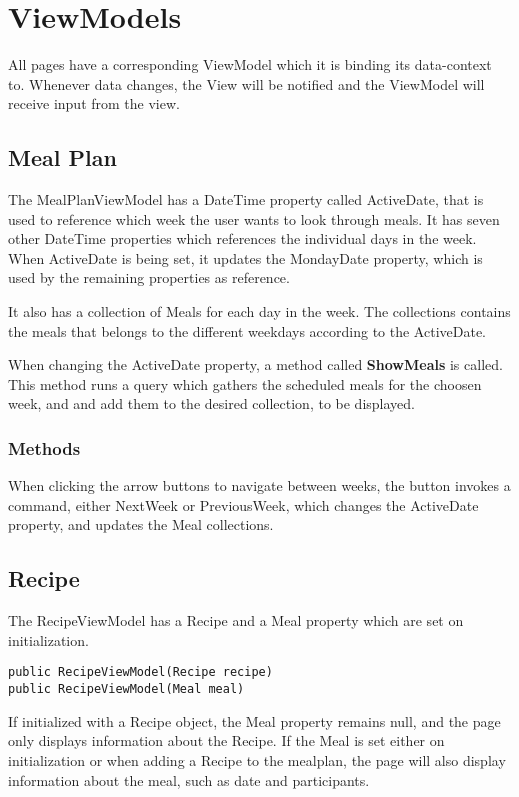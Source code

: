 \chapter{ViewModels}
All pages have a corresponding ViewModel which it is binding its data-context to. Whenever data changes, the View will be notified and the ViewModel will receive input from the view.

\section{Meal Plan}

The MealPlanViewModel has a DateTime property called ActiveDate, that is used to reference which week the user wants to look through meals. It has seven other DateTime properties which references the individual days in the week. When ActiveDate is being set, it updates the MondayDate property, which is used by the remaining properties as reference.

It also has a collection of Meals for each day in the week. The collections contains the meals that belongs to the different weekdays according to the ActiveDate.

When changing the ActiveDate property, a method called \textbf{ShowMeals} is called. This method runs a query which gathers the scheduled meals for the choosen week, and and add them to the desired collection, to be displayed. 

\subsection{Methods}
When clicking the arrow buttons to navigate between weeks, the button invokes a command, either NextWeek or PreviousWeek, which changes the ActiveDate property, and updates the Meal collections.


\section{Recipe}

The RecipeViewModel has a Recipe and a Meal property which are set on initialization.
\begin{lstlisting}[caption=Recipe ViewModel Constructors., language=CSharp]
public RecipeViewModel(Recipe recipe)
public RecipeViewModel(Meal meal)
\end{lstlisting}
        

If initialized with a Recipe object, the Meal property remains null, and the page only displays information about the Recipe. If the Meal is set either on initialization or when adding a Recipe to the mealplan, the page will also display information about the meal, such as date and participants.

